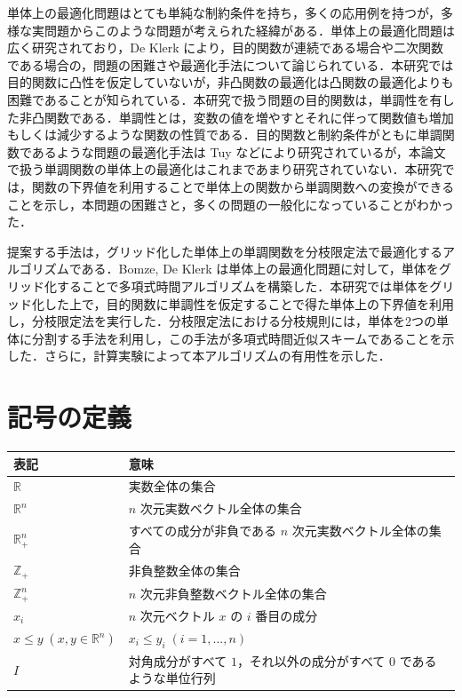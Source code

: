\documentclass[a4paper,11pt]{jreport}
\begin{document}
単体上の最適化問題はとても単純な制約条件を持ち，多くの応用例を持つが，多様な実問題からこのような問題が考えられた経緯がある．単体上の最適化問題は広く研究されており，De Klerk \cite{deklerk_survey} により，目的関数が連続である場合や二次関数である場合の，問題の困難さや最適化手法について論じられている．本研究では目的関数に凸性を仮定していないが，非凸関数の最適化は凸関数の最適化よりも困難であることが知られている．本研究で扱う問題の目的関数は，単調性を有した非凸関数である．単調性とは，変数の値を増やすとそれに伴って関数値も増加もしくは減少するような関数の性質である．目的関数と制約条件がともに単調関数であるような問題の最適化手法は Tuy \cite{tuy} などにより研究されているが，本論文で扱う単調関数の単体上の最適化はこれまであまり研究されていない．本研究では，関数の下界値を利用することで単体上の関数から単調関数への変換ができることを示し，本問題の困難さと，多くの問題の一般化になっていることがわかった．\par
提案する手法は，グリッド化した単体上の単調関数を分枝限定法で最適化するアルゴリズムである．Bomze, De Klerk \cite{bomze} は単体上の最適化問題に対して，単体をグリッド化することで多項式時間アルゴリズムを構築した．本研究では単体をグリッド化した上で，目的関数に単調性を仮定することで得た単体上の下界値を利用し，分枝限定法を実行した．分枝限定法における分枝規則には，単体を2つの単体に分割する手法を利用し，この手法が多項式時間近似スキームであることを示した．さらに，計算実験によって本アルゴリズムの有用性を示した．

\section{記号の定義}

\begin{table}[htb]
\begin{tabular}{ll}
表記 & 意味 \\ \hline
$ \mathbb{R} $ & 実数全体の集合 \\
$ \mathbb{R}^n $ & $ n $ 次元実数ベクトル全体の集合 \\
$ \mathbb{R}_+^n $ & すべての成分が非負である $ n $ 次元実数ベクトル全体の集合 \\
$ \mathbb{Z}_+ $ & 非負整数全体の集合 \\
$ \mathbb{Z}_+^n $ & $ n $ 次元非負整数ベクトル全体の集合 \\
$ x_i $ & $ n $ 次元ベクトル $ x $ の $ i $ 番目の成分 \\
$ x \leq y \; (x, y \in \mathbb{R}^n) $ & $ x_i \leq y_i \; (i = 1, ..., n) $ \\
$ I $ & 対角成分がすべて $ 1 $，それ以外の成分がすべて $ 0 $ であるような単位行列
\end{tabular}
\end{table}
\end{document}
